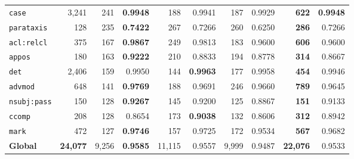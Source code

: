 \begin{table}[p]
\begin{tabular}{l r| r r| r r| r r| r r}
  \texttt{case} & 3,241 & 241 & \textbf{0.9948} & 188 & 0.9941 & 187 & 0.9929 & \textbf{622} & \textbf{0.9948} \\
  \texttt{parataxis} & 128 & 235 & \textbf{0.7422} & 267 & 0.7266 & 260 & 0.6250 & \textbf{286} & 0.7266 \\
  \texttt{acl\!:\!relcl} & 375 & 167 & \textbf{0.9867} & 249 & 0.9813 & 183 & 0.9600 & \textbf{606} & 0.9600 \\
  \texttt{appos} & 180 & 163 & \textbf{0.9222} & 210 & 0.8833 & 194 & 0.8778 & \textbf{314} & 0.8667 \\
  \texttt{det} & 2,406 & 159 & 0.9950 & 144 & \textbf{0.9963} & 177 & 0.9958 & \textbf{454} & 0.9946 \\
  \texttt{advmod} & 648 & 141 & \textbf{0.9769} & 188 & 0.9691 & 246 & 0.9660 & \textbf{789} & 0.9645 \\
  \texttt{nsubj\!:\!pass} & 150 & 128 & \textbf{0.9267} & 145 & 0.9200 & 125 & 0.8867 & \textbf{151} & 0.9133 \\
  \texttt{ccomp} & 208 & 128 & 0.8654 & 173 & \textbf{0.9038} & 132 & 0.8606 & \textbf{312} & 0.8942 \\
  \texttt{mark} & 472 & 127 & \textbf{0.9746} & 157 & 0.9725 & 172 & 0.9534 & \textbf{567} & 0.9682 \\
\midrule
  \textbf{Global} & \textbf{24,077} & 9,256 & \textbf{0.9585} & 11,115 & 0.9557 & 9,999 & 0.9487 & \textbf{22,076} & 0.9533 \\
\bottomrule
\end{tabular}
\endgroup
\instablegendaFull
\end{table}

